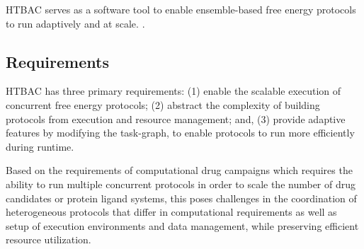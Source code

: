 HTBAC serves as a software tool to enable ensemble-based free energy protocols
to run adaptively and at scale. .




\subsection{Requirements}

HTBAC has three primary requirements: (1) enable the scalable execution of
concurrent free energy protocols; (2) abstract the complexity of building
protocols
from execution and resource management; and, (3) provide
adaptive features by modifying the task-graph, to enable protocols to run more 
efficiently during runtime.  


Based on the requirements of computational drug campaigns  
which requires the ability to run multiple concurrent protocols in order to 
scale the number of drug candidates or protein ligand systems, this poses 
challenges in the coordination of heterogeneous protocols that differ in 
computational requirements as well as setup of execution environments and data
management, while preserving efficient resource utilization. 


